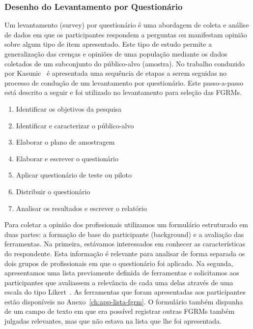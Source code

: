 \subsubsection{Desenho do Levantamento por Questionário}\label{ssub:metodologia_desenho_da_pesquisa_com_profissionais}

Um levantamento (survey) por questionário é uma abordagem de coleta e análise
de dados em que os participantes respondem a perguntas ou manifestam opinião
sobre algum tipo de item apresentado. Este tipo de estudo permite a
generalização das crenças e opiniões de uma população mediante os dados
coletados de um subconjunto do público-alvo (amostra). No trabalho conduzido
por Kasunic~\cite{kasunic2005designing} é apresentada uma sequência de etapas a
serem seguidas no processo de condução de um levantamento por questionário.
Este passo-a-passo está descrito a seguir e foi utilizado no levantamento para
seleção das FGRMs.

\begin{enumerate}
    \item{Identificar os objetivos da pesquisa}
    \item{Identificar e caracterizar o público-alvo}
    \item{Elaborar o plano de amostragem}
    \item{Elaborar e escrever o questionário}
    \item{Aplicar questionário de teste ou piloto}
    \item{Distribuir o questionário}
    \item{Analisar os resultados e escrever o relatório}
\end{enumerate}

Para coletar a opinião dos profissionais utilizamos um formulário estruturado
em duas partes: a formação de base do participante (background) e a avaliação
das ferramentas. Na primeira, estávamos interessados em conhecer as
características do respondente. Esta informação é relevante para analisar de
forma separada os dois grupos de profissionais em que o questionário foi
aplicado. Na segunda, apresentamos uma lista previamente definida de
ferramentas e solicitamos aos participantes que avaliassem a relevância de cada
uma delas através de uma escala do tipo Likert~\cite{robbins2011plotting}. As
ferramentas que foram apresentadas aos participantes estão disponíveis no
Anexo~\ref{ch:app-lista-fgrm}. O formulário também dispunha de um campo de
texto em que era possível registrar outras FGRMs também julgadas relevantes,
mas que não estava na lista que lhe foi apresentada.

